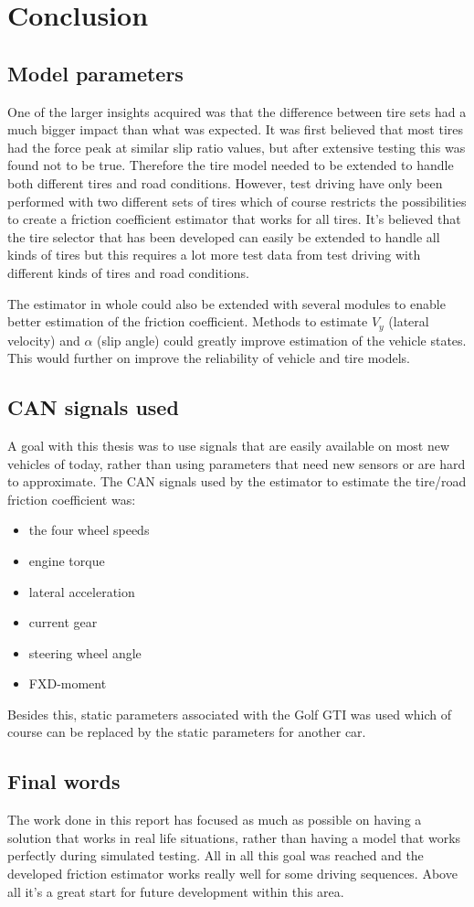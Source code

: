 \chapter{Conclusion}
\section{Model parameters}
One of the larger insights acquired was that the difference between tire sets had a much bigger impact than what was expected. It was first believed that most tires had the force peak at similar slip ratio values, but after extensive testing this was found not to be true. Therefore the tire model needed to be extended to handle both different tires and road conditions. However, test driving have only been performed with two different sets of tires which of course restricts the possibilities to create a friction coefficient estimator that works for all tires. It's believed that the tire selector that has been developed can easily be extended to handle all kinds of tires but this requires a lot more test data from test driving with different kinds of tires and road conditions.

The estimator in whole could also be extended with several modules to enable better estimation of the friction coefficient. Methods to estimate $ V_{y} $ (lateral velocity) and $ \alpha $ (slip angle) could greatly improve estimation of the vehicle states. This would further on improve the reliability of vehicle and tire models.

\section{CAN signals used}
A goal with this thesis was to use signals that are easily available on most new vehicles of today, rather than using parameters that need new sensors or are hard to approximate. The CAN signals used by the estimator to estimate the tire/road friction coefficient was:
\begin{itemize}
	\item the four wheel speeds
	\item engine torque
	\item lateral acceleration
	\item current gear
	\item steering wheel angle
	\item FXD-moment
\end{itemize}
Besides this, static parameters associated with the Golf GTI was used which of course can be replaced by the static parameters for another car.  

\section{Final words}
The work done in this report has focused as much as possible on having a solution that works in real life situations, rather than having a model that works perfectly during simulated testing. All in all this goal was reached and the developed friction estimator works really well for some driving sequences. Above all it's a great start for future development within this area.
